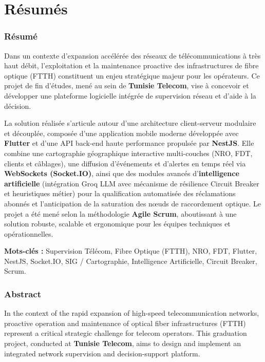 \chapter*{R\'esum\'es}

\subsection*{R\'esum\'e}
Dans un contexte d'expansion acc\'el\'er\'ee des r\'eseaux de t\'el\'ecommunications \`a tr\`es haut d\'ebit, l'exploitation et la maintenance proactive des infrastructures de fibre optique (FTTH) constituent un enjeu strat\'egique majeur pour les op\'erateurs. Ce projet de fin d'\'etudes, men\'e au sein de \textbf{Tunisie Telecom}, vise \`a concevoir et d\'evelopper une plateforme logicielle int\'egr\'ee de supervision r\'eseau et d'aide \`a la d\'ecision. 

La solution r\'ealis\'ee s'articule autour d'une architecture client-serveur modulaire et d\'ecoupl\'ee, compos\'ee d'une application mobile moderne d\'evelopp\'ee avec \textbf{Flutter} et d'une API back-end haute performance propuls\'ee par \textbf{NestJS}. Elle combine une cartographie g\'eographique interactive multi-couches (NRO, FDT, clients et c\^ablages), une diffusion d'\'ev\'enements et d'alertes en temps r\'eel via \textbf{WebSockets (Socket.IO)}, ainsi que des modules avanc\'es d'\textbf{intelligence artificielle} (int\'egration Groq LLM avec m\'ecanisme de r\'esilience Circuit Breaker et heuristiques m\'etier) pour la qualification automatis\'ee des r\'eclamations abonn\'es et l'anticipation de la saturation des n\oe uds de raccordement optique. Le projet a \'et\'e men\'e selon la m\'ethodologie \textbf{Agile Scrum}, aboutissant \`a une solution robuste, scalable et ergonomique pour les \'equipes techniques et op\'erationnelles.

\vspace{0.3cm}
\textbf{Mots-cl\'es :} Supervision T\'el\'ecom, Fibre Optique (FTTH), NRO, FDT, Flutter, NestJS, Socket.IO, SIG / Cartographie, Intelligence Artificielle, Circuit Breaker, Scrum.

\vspace{0.8cm}
\subsection*{Abstract}
In the context of the rapid expansion of high-speed telecommunication networks, proactive operation and maintenance of optical fiber infrastructures (FTTH) represent a critical strategic challenge for telecom operators. This graduation project, conducted at \textbf{Tunisie Telecom}, aims to design and implement an integrated network supervision and decision-support platform.

